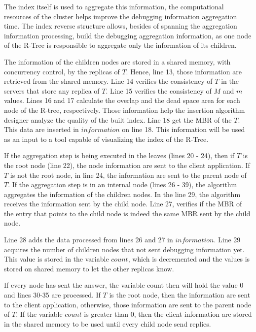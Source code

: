 The index itself is used to aggregate this information, the computational resources of the cluster helps improve the debugging information aggregation time. 
The index reverse structure allows, besides of spanning the aggregation information processing, build the debugging aggregation information, as one node of the R-Tree is responsible to aggregate only the information of its children. 

The information of the children nodes are stored in a shared memory, with concurrency control, by the replicas of $T$. Hence, line 13, those information are retrieved from the shared memory. 
Line 14 verifies the consistency of $T$ in the servers that store any replica of $T$. Line 15 verifies the consistency of $M$ and $m$ values. 
Lines 16 and 17 calculate the overlap and the dead space area for each node of the R-tree, respectively. Those information help the insertion algorithm designer analyze the quality of the built index. 
Line 18 get the MBR of the $T$. This data are inserted in $information$ on line 18. This information will be used as an input to a tool capable of visualizing the index of the R-Tree.
	
If the aggregation step is being executed in the leaves (lines 20 - 24), then if  $T$ is the root node (line 22), the node information are sent to the client application. 
If $T$ is not the root node, in line 24, the information are sent to the parent node of $T$. If the aggregation step is in an internal node (lines 26 - 39), the algorithm aggregates the information of the children nodes. 
In the line 29, the algorithm receives the information sent by the child node. Line 27, verifies if the MBR of the entry that points to the child node is indeed the same MBR sent by the child node.
	
Line 28 adds the data processed from lines 26 and 27 in $information$. Line 29 acquires the number of children nodes that not sent debugging information yet. 
This value is stored in the variable $count$, which is decremented and the values is stored on shared memory to let the other replicas know.
	
If every node has sent the answer, the variable count then will hold the value 0 and lines 30-35 are processed. 
If $T$ is the root node, then the information are sent to the client application, otherwise, those information are sent to the parent node of $T$. 
If the variable $count$ is greater than 0, then the client information are stored in the shared memory to be used until every child node send replies.	
	
